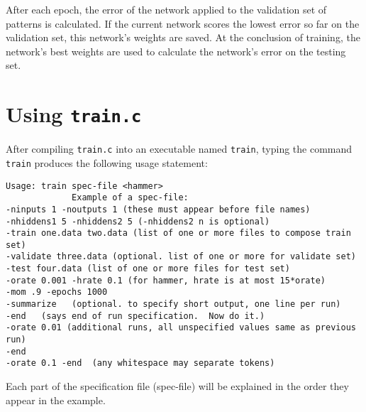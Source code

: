 After each epoch, the error of the network applied to the validation set of
patterns is calculated.  If the current network scores the lowest error so far
on the validation set, this network's weights are saved.
At the conclusion of training, the network's best weights are used to
calculate the network's error on the testing set.  

\section{Using {\tt train.c}}

After compiling \verb'train.c' into an executable named \verb'train', typing
the command \verb'train' produces the
following usage statement:
\begin{verbatim}
Usage: train spec-file <hammer>
             Example of a spec-file:
-ninputs 1 -noutputs 1 (these must appear before file names)
-nhiddens1 5 -nhiddens2 5 (-nhiddens2 n is optional)
-train one.data two.data (list of one or more files to compose train set)
-validate three.data (optional. list of one or more for validate set)
-test four.data (list of one or more files for test set)
-orate 0.001 -hrate 0.1 (for hammer, hrate is at most 15*orate)
-mom .9 -epochs 1000
-summarize   (optional. to specify short output, one line per run)
-end   (says end of run specification.  Now do it.)
-orate 0.01 (additional runs, all unspecified values same as previous run)
-end
-orate 0.1 -end  (any whitespace may separate tokens)
\end{verbatim}
Each part of the specification file (spec-file) will be explained in the order
they appear in the example. 
